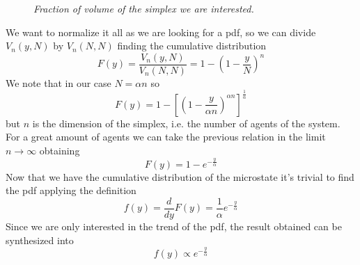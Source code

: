 \begin{figure}[ht!]
    \centering
    \caption{\emph{Fraction of volume of the simplex we are interested.}}
    \label{fig:simplexVolume}
\end{figure}
We want to normalize it all as we are looking for a pdf, so we can divide $V_n\left(y, N\right)$ by $V_n\left(N, N\right)$ finding the cumulative distribution
\begin{equation}
    F(y) = \frac{V_n\left(y, N\right)}{V_n\left(N, N\right)} = 1 - \left(1 - \frac{y}{N}\right)^n
\end{equation}
We note that in our case $N=\alpha n$ so
\begin{equation*}
    F(y) =  1 - \left[\left(1 - \frac{y}{\alpha n}\right)^{\alpha n}\right]^\frac{1}{\alpha}
\end{equation*}
but $n$ is the dimension of the simplex, i.e. the number of agents of the system.
For a great amount of agents we can take the previous relation in the limit $n\to\infty$ obtaining
\begin{equation}
    F(y) = 1 - e^{-\frac{y}{\alpha}}
\end{equation}
Now that we have the cumulative distribution of the microstate it's trivial to find the pdf applying the definition
\begin{equation*}
    f(y) = \frac{d}{dy}F(y) = \frac{1}{\alpha} e^{-\frac{y}{\alpha}}
\end{equation*}
Since we are only interested in the trend of the pdf, the result obtained can be synthesized into
\begin{equation}
    f(y) \propto e^{-\frac{y}{\alpha}}
\end{equation}
